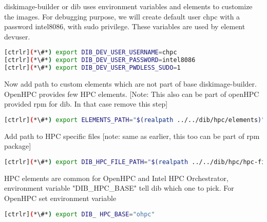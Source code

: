 diskimage-builder or dib uses environment variables and elements to customize the images. For debugging purpose, we will create default user chpc with a password intel8086, with sudo privilege. These variables are used by element devuser. 

\begin{lstlisting}[language=bash,keywords={}]
[ctrlr](*\#*) export DIB_DEV_USER_USERNAME=chpc
[ctrlr](*\#*) export DIB_DEV_USER_PASSWORD=intel8086
[ctrlr](*\#*) export DIB_DEV_USER_PWDLESS_SUDO=1
\end{lstlisting}

Now add path to custom elements which are not part of base diskimage-builder. OpenHPC provides few HPC elements. [Note: This also can be part of openHPC provided rpm for dib. In that case remove this step]

\begin{lstlisting}[language=bash,keywords={}]
[ctrlr](*\#*) export ELEMENTS_PATH="$(realpath ../../dib/hpc/elements)"
\end{lstlisting}

Add path to HPC specific files [note: same as earlier, this too can be part of rpm package]

\begin{lstlisting}[language=bash,keywords={}]
[ctrlr](*\#*) export DIB_HPC_FILE_PATH="$(realpath ../../dib/hpc/hpc-files/)"
\end{lstlisting}

HPC elements are common for OpenHPC and Intel HPC Orchestrator, environment variable "DIB\_HPC\_BASE" tell dib which one to pick. For OpenHPC set environment variable

\begin{lstlisting}[language=bash,keywords={}]
[ctrlr](*\#*) export DIB_ HPC_BASE="ohpc"
\end{lstlisting}

